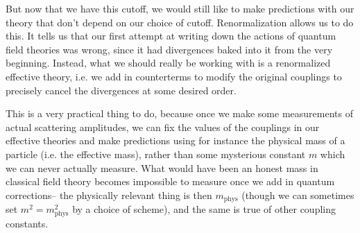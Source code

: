 But now that we have this cutoff, we would still like to make predictions with our theory that don't depend on our choice of cutoff. Renormalization allows us to do this. It tells us that our first attempt at writing down the actions of quantum field theories was wrong, since it had divergences baked into it from the very beginning. Instead, what we should really be working with is a renormalized effective theory, i.e. we add in counterterms to modify the original couplings to precisely cancel the divergences at some desired order.

This is a very practical thing to do, because once we make some measurements of actual scattering amplitudes, we can fix the values of the couplings in our effective theories and make predictions using for instance the physical mass of a particle (i.e. the effective mass), rather than some mysterious constant $m$ which we can never actually measure. What would have been an honest mass in classical field theory becomes impossible to measure once we add in quantum corrections-- the physically relevant thing is then $m_{\text{phys}}$ (though we can sometimes set $m^2=m_{\text{phys}}^2$ by a choice of scheme), and the same is true of other coupling constants.